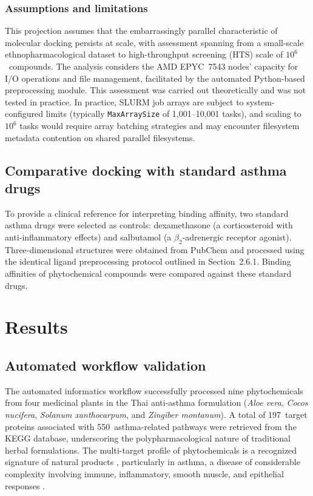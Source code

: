 \documentclass[11pt,a4paper]{article}
\begin{document}
\subsubsection{Assumptions and limitations}

This projection assumes that the embarrassingly parallel characteristic of molecular docking persists at scale, with assessment spanning from a small-scale ethnopharmacological dataset to high-throughput screening (HTS) scale of $10^6$~compounds. The analysis considers the AMD EPYC~7543 nodes' capacity for I/O operations and file management, facilitated by the automated Python-based preprocessing module. This assessment was carried out theoretically and was not tested in practice. In practice, SLURM job arrays are subject to system-configured limits (typically \texttt{MaxArraySize} of 1,001--10,001 tasks), and scaling to $10^6$ tasks would require array batching strategies and may encounter filesystem metadata contention on shared parallel filesystems.


\subsection{Comparative docking with standard asthma drugs}

To provide a clinical reference for interpreting binding affinity, two standard asthma drugs were selected as controls: dexamethasone (a corticosteroid with anti-inflammatory effects) and salbutamol (a $\beta_2$-adrenergic receptor agonist). Three-dimensional structures were obtained from PubChem and processed using the identical ligand preprocessing protocol outlined in Section~2.6.1. Binding affinities of phytochemical compounds were compared against these standard drugs.


\section{Results}

\subsection{Automated workflow validation}

The automated informatics workflow successfully processed nine phytochemicals from four medicinal plants in the Thai anti-asthma formulation (\textit{Aloe vera}, \textit{Cocos nucifera}, \textit{Solanum xanthocarpum}, and \textit{Zingiber montanum}). A total of 197~target proteins associated with 550~asthma-related pathways were retrieved from the KEGG database, underscoring the polypharmacological nature of traditional herbal formulations. The multi-target profile of phytochemicals is a recognized signature of natural products \cite{babalola2025}, particularly in asthma, a disease of considerable complexity involving immune, inflammatory, smooth muscle, and epithelial responses \cite{habib2022}.
\end{document}
